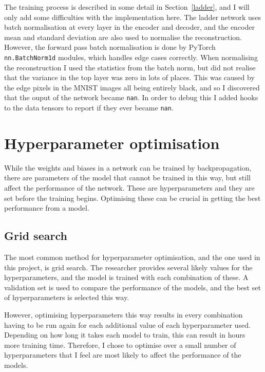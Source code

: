 The training process is described in some detail in Section~\ref{ladder}, and I will only add some difficulties with the implementation 
here. The ladder network uses batch normalisation at every layer in the encoder and decoder, and the encoder mean and standard deviation
are also used to normalise the reconstruction. However, the forward pass batch normalisation is done by PyTorch \texttt{nn.BatchNorm1d}
modules, which handles edge cases correctly. When normalising the reconstruction I used the statistics from the batch norm, but did 
not realise that the variance in the top layer was zero in lots of places. This was caused by the edge pixels in the MNIST images all 
being entirely black, and so I discovered that the ouput of the network became \texttt{nan}. In order to debug this I added hooks to the
data tensors to report if they ever became \texttt{nan}.

\section{Hyperparameter optimisation} \label{hyper}
While the weights and biases in a network can be trained by backpropagation, there are parameters of the model that cannot be trained in 
this way, but still affect the performance of the network. These are hyperparameters and they are set before the training begins. 
Optimising these can be crucial in getting the best performance from a model.

\subsection{Grid search}
The most common method for hyperparameter optimisation, and the one used in this project, is grid search. The researcher provides several 
likely values for the hyperparameters, and the model is trained with each combination of these. A validation set is used to compare the
performance of the models, and the best set of hyperparameters is selected this way.

However, optimising hyperparameters this way results in every combination having to be run again for each additional value of each
hyperparameter used. Depending on how long it takes each model to train, this can result in hours more training time. 
Therefore, I chose to optimise over a small number of hyperparameters that I feel are most likely to affect the performance of the models.

